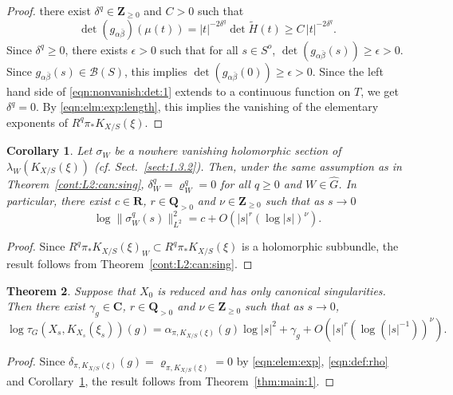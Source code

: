 \documentclass[amscd, leqno]{amsart}
\theoremstyle{plain}
\newtheorem{theorem}{Theorem}[section]
\newtheorem{corollary}[theorem]{Corollary}
\theoremstyle{definition}
\theoremstyle{remark}
\newenvironment{pf}{\begin{proof}}{\end{proof}}
\begin{document}
\begin{pf}
there exist $\delta^{q}\in{\mathbf Z}_{\geq0}$ and $C>0$ such that
\begin{equation}
\label{eqn:nonvanish:det:1}
\det( g_{\alpha\bar{\beta}})( \mu(t) ) = |t|^{-2\delta^{q}} \det \widetilde{H}(t) \geq C\,|t|^{-2\delta^{q}}.
\end{equation}
Since $\delta^{q}\geq0$, there exists $\epsilon>0$ such that for all $s\in S^{o}$, $\det(g_{\alpha\bar{\beta}}(s)) \geq \epsilon>0$.
Since $g_{\alpha\bar{\beta}}(s)\in{\mathcal B}(S)$, this implies $\det(g_{\alpha\bar{\beta}}(0))\geq\epsilon>0$.
Since the left hand side of \eqref{eqn:nonvanish:det:1} extends to a continuous function on $T$, we get $\delta^{q}=0$. 
By \eqref{eqn:elm:exp:length}, this implies the vanishing of the elementary exponents of $R^{q}\pi_{*}K_{X/S}(\xi)$.
\end{pf}


\begin{corollary}
\label{cor:C0:L2}
Let $\sigma_{W}$ be a nowhere vanishing holomorphic section of $\lambda_{W}(K_{X/S}(\xi))$ (cf. Sect.~\ref{sect:1.3.2}).
Then, under the same assumption as in Theorem~\ref{cont:L2:can:sing}, $\delta_{W}^{q}=\varrho_{W}^{q}=0$ 
for all $q\geq 0$ and $W \in \widehat{G}$. In particular, 
there exist $c\in{\mathbf R}$, $r\in{\mathbf Q}_{>0}$ and $\nu\in{\mathbf Z}_{\geq0}$ such that as $s\to0$
$$
\log\|\sigma_{W}^{q}(s)\|_{L^{2}}^{2} = c + O\left(|s|^{r}(\log|s|)^{\nu}\right).
$$
\end{corollary}

\begin{pf}
Since $R^{q}\pi_{*}K_{X/S}(\xi)_{W} \subset R^{q}\pi_{*}K_{X/S}(\xi)$ is a holomorphic subbundle, 
the result follows from Theorem~\ref{cont:L2:can:sing}. 
\end{pf}


\begin{theorem}
\label{thm:sing:tor:can}
Suppose that $X_{0}$ is reduced and has only canonical singularities. 
Then there exist $\gamma_{g} \in {\mathbf C}$, $r\in{\mathbf Q}_{>0}$ and $\nu\in{\mathbf Z}_{\geq0}$ such that as $s \to 0$,
$$
\log\tau_{G}(X_{s},K_{X_{s}}(\xi_{s}))(g) = \alpha_{\pi,K_{X/S}(\xi)}(g) \log |s|^{2} + \gamma_{g} + O\left( |s|^{r} ( \log (|s|^{-1}) )^{\nu} \right).
$$
\end{theorem}

\begin{pf}
Since $\delta_{\pi,K_{X/S}(\xi)}(g) = \varrho_{\pi, K_{X/S}(\xi)} =0$ by \eqref{eqn:elem:exp}, \eqref{eqn:def:rho} and Corollary~\ref{cor:C0:L2}, 
the result follows from Theorem~\ref{thm:main:1}.
\end{pf}
\end{document}
